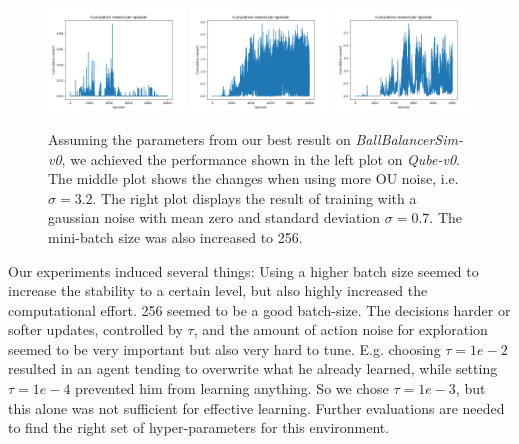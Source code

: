 \begin{figure}[H]
	\begin{center}
	\includegraphics[width=0.325\textwidth]{plots/ddpg_qube_ou_bad_train.png}
	\includegraphics[width=0.325\textwidth]{plots/ddpg_qube_ou_better_train.png}
	\includegraphics[width=0.325\textwidth]{plots/ddpg_qube_gauss.png}
	\caption{Assuming the parameters from our best result on \textit{BallBalancerSim-v0}, we achieved the performance shown in the left plot on \textit{Qube-v0}. The middle plot shows the changes when using more OU noise, i.e. $\sigma=3.2$. The right plot displays the result of training with a gaussian noise with mean zero and 
	standard deviation $\sigma=0.7$. The mini-batch size was also increased to 
	256.}
	\label{ddpg:qube}
\end{center}
\end{figure}
Our experiments induced several things: Using a higher batch size seemed to increase the stability to a certain level, but also highly increased the computational effort. 256 seemed to be a good batch-size. The decisions harder or softer updates, controlled by $\tau$, and the amount of action noise for exploration seemed to be very important but also very hard to tune. E.g. choosing $\tau=1e-2$ resulted in an agent tending to overwrite what he already learned, while setting $\tau=1e-4$ prevented him from learning anything. So we chose $\tau=1e-3$, but this alone was not sufficient for effective learning. Further evaluations are needed to find the right set of hyper-parameters for this environment. 
